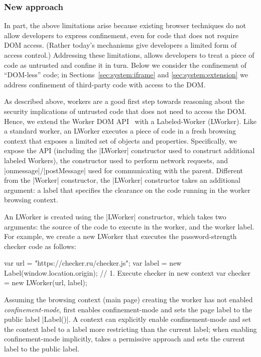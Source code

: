 \subsubsection{New approach}
%
In part, the above limitations arise because existing browser
techniques do not allow developers to express confinement, even for
code that does not require DOM access.
%
(Rather today's mechanisms give developers a limited form of access
control.)
%
Addressing these limitations, \sys{} allows developers to treat a
piece of code as untrusted and confine it in turn.
%
Below we consider the confinement of ``DOM-less'' code; in
Sections~\ref{sec:system:iframe} and \ref{sec:system:extension} we
address confinement of third-party code with access to the DOM.

As described above, workers are a good first step towards reasoning
about the security implications of untrusted code that does not need
to access the DOM.
%
Hence, we extend the Worker DOM API~ with a
Labeled-Worker (LWorker).
%
Like a standard worker, an LWorker executes a piece of code in a fresh
browsing context that exposes a limited set of objects and properties.
%
Specifically, we expose the \sys{} API (including the \js|LWorker|
constructor used to construct additional labeled Workers), the \xhr{}
constructor used to perform network requests, and
\js|onmessage|/\js|postMessage| used for communicating with the
parent.
%
Different from the \js|Worker| constructor, the \js|LWorker|
constructor takes an additional argument: a label that specifies the
clearance on the code running in the worker browsing context.

An LWorker is created using the \js|LWorker| constructor,
which takes two arguments: the source of the code to execute in the
worker, and the worker label.
%
For example, we create a new LWorker that executes the
password-strength checker code as follows:
\begin{jscode}
var url = "https://checker.ru/checker.js";
var label = new Label(window.location.origin);
// 1. Execute checker in new context
var checker = new LWorker(url, label);
\end{jscode}
%
Assuming the browsing context (main page) creating the worker has not
enabled \emph{confinement-mode}, \sys{} first enables confinement-mode
and sets the page label to the public label \js|Label()|.
%
A context can explicitly enable confinement-mode and set the context
label to a label more restricting than the current label; when
enabling confinement-mode implicitly, \sys{} takes a permissive
approach and sets the current label to the public label.
 
